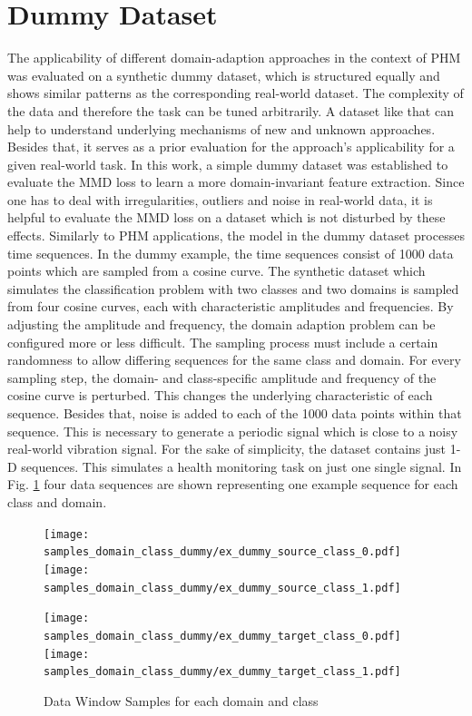 \section{Dummy Dataset}
The applicability of different domain-adaption approaches in the context of PHM was evaluated on a synthetic dummy dataset, which is structured equally and shows similar patterns as the corresponding real-world dataset. The complexity of the data and therefore the task can be tuned arbitrarily. A dataset like that can help to understand underlying mechanisms of new and unknown approaches. Besides that, it serves as a prior evaluation for the approach's applicability for a given real-world task. In this work, a simple dummy dataset was established to evaluate the MMD loss to learn a more domain-invariant feature extraction. Since one has to deal with irregularities, outliers and noise in real-world data, it is helpful to evaluate the MMD loss on a dataset which is not disturbed by these effects. Similarly to PHM applications, the model in the dummy dataset processes time sequences. In the dummy example, the time sequences consist of 1000 data points which are sampled from a cosine  curve. The synthetic dataset which simulates the classification problem with two classes and two domains is sampled from four cosine  curves, each with characteristic amplitudes and frequencies. By adjusting the amplitude and frequency, the domain adaption problem can be configured more or less difficult. The sampling process must include a certain randomness to allow differing sequences for the same class and domain. For every sampling step, the domain- and class-specific amplitude and frequency of the cosine  curve is perturbed. This changes the underlying characteristic of each sequence. Besides that, noise is added to each of the 1000 data points within that sequence. This is necessary to generate a periodic signal which is close to a noisy real-world vibration signal. For the sake of simplicity, the dataset contains just 1-D sequences. This simulates a health monitoring task on just one single signal. In Fig. \ref{fig:samples_domain_class_dummy} four data sequences are shown representing one example sequence for each class and domain. 

\begin{figure}[H]
  \centering
  \texttt{[image: samples\_domain\_class\_dummy/ex\_dummy\_source\_class\_0.pdf]}
  \hspace{.3cm}
  \texttt{[image: samples\_domain\_class\_dummy/ex\_dummy\_source\_class\_1.pdf]}

  \vspace{.1cm}

  \texttt{[image: samples\_domain\_class\_dummy/ex\_dummy\_target\_class\_0.pdf]}
  \hspace{.3cm}
  \texttt{[image: samples\_domain\_class\_dummy/ex\_dummy\_target\_class\_1.pdf]}

  \caption{Data Window Samples for each domain and class}
  \label{fig:samples_domain_class_dummy}
\end{figure}


